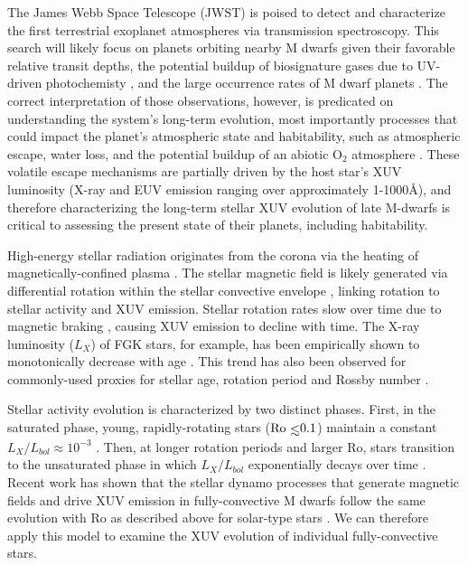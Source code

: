 \documentclass[twocolumn]{aastex62}
\def\lsim{~\rlap{$<$}{\lower 1.0ex\hbox{$\sim$}}}
\begin{document}
The James Webb Space Telescope (JWST) is poised to detect and characterize the first terrestrial exoplanet atmospheres via transmission spectroscopy. This search will likely focus on planets orbiting nearby M dwarfs given their favorable relative transit depths, the potential buildup of biosignature gases due to UV-driven photochemisty \citep{Segura2005}, and the large occurrence rates of M dwarf planets \citep{Dressing2015}. The correct interpretation of those observations, however, is predicated on understanding the system's long-term evolution, most importantly processes that could impact the planet's atmospheric state and habitability, such as atmospheric escape, water loss, and the potential buildup of an abiotic O$_2$ atmosphere \citep{Watson1981,Lammer2003,MurrayClay2009,Luger2015}. These volatile escape mechanisms are partially driven by the host star's XUV luminosity (X-ray and EUV emission ranging over approximately 1-1000\AA), and therefore characterizing the long-term stellar XUV evolution of late M-dwarfs is critical to assessing the present state of their planets, including habitability.

High-energy stellar radiation originates from the corona via the heating of magnetically-confined plasma \citep{Vaiana1981}. The stellar magnetic field is likely generated via differential rotation within the stellar convective envelope \citep{Parker1955}, linking rotation to stellar activity and XUV emission. Stellar rotation rates slow over time due to magnetic braking \citep{Skumanich1972}, causing XUV emission to decline with time. The X-ray luminosity ($L_{X}$) of FGK stars, for example, has been empirically shown to monotonically decrease with age \citep{Jackson2012}. This trend has also been observed for commonly-used proxies for stellar age, rotation period and Rossby number \citep[Ro = $P_{rot}/\tau$ for convective turnover timescale $\tau$,][]{Pizzolato2003,Wright2011}. 

Stellar activity evolution is characterized by two distinct phases. First, in the saturated phase, young, rapidly-rotating stars ($\mathrm{Ro}\lsim 0.1$) maintain a constant $L_{X}/L_{bol} \approx 10^{-3}$ \citep{Wright2011,Jackson2012}. Then, at longer rotation periods and larger Ro, stars transition to the unsaturated phase in which $L_{X}/L_{bol}$ exponentially decays over time \citep{Pizzolato2003,Ribas2005}. Recent work has shown that the stellar dynamo processes that generate magnetic fields and drive XUV emission in fully-convective M dwarfs follow the same evolution with Ro as described above for solar-type stars \citep{Wright2016,Wright2018}. We can therefore apply this model to examine the XUV evolution of individual fully-convective stars.
\end{document}
